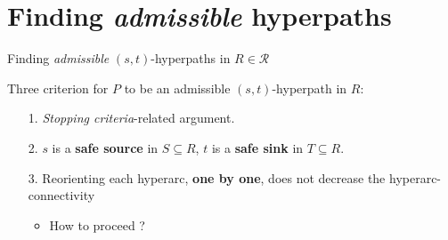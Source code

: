 \documentclass[10pt, aspectratio=43,compress]{beamer}
\begin{document}
	\section{Finding \textit{admissible} hyperpaths}
	\begin{frame}{Finding \textit{admissible} $(s, t)$-hyperpaths in $R\in\mathcal{R}$}

		\begin{tcolorbox}[colback=darkseagreen!5!white,colframe=darkseagreen!75!black,title=Admissible hyperpaths]
			Three criterion for $P$ to be an admissible $(s, t)$-hyperpath in $R$:	
			\begin{itemize}
				\item[1.] \textit{Stopping criteria}-related argument.
				\item[2.] $s$ is a \textbf{safe source} in $S\subseteq{R}$, $t$ is a \textbf{safe sink} in $T\subseteq{R}$.
				\item[3.] Reorienting each hyperarc, \textbf{one by one}, does not decrease the hyperarc-connectivity{\begin{itemize}\item How to proceed ?\end{itemize}}
			\end{itemize}
		\end{tcolorbox}
	\end{frame}
\end{document}
